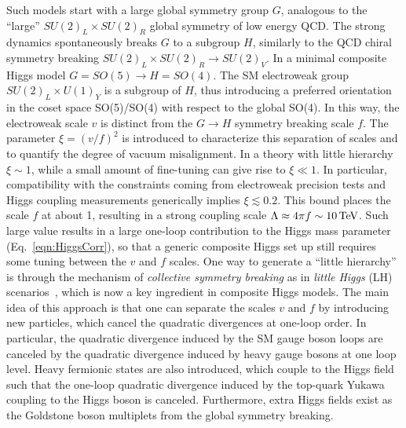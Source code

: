 Such models start with a large global symmetry group $G$, analogous to the ``large'' $SU(2)_L \times SU(2)_R$ global symmetry of low energy QCD.
The strong dynamics spontaneously breaks $G$ to a subgroup $H$, similarly to the QCD chiral symmetry breaking $SU(2)_L \times SU(2)_R \to SU(2)_V$.
In a minimal composite Higgs model $G = SO(5) \to H = SO(4)$.
The SM electroweak group $SU(2)_L \times U(1)_Y$ is a subgroup of $H$, thus introducing a preferred orientation in the coset space SO(5)/SO(4) with respect to the global SO(4).
In this way, the electroweak scale $v$ is distinct from the $G \to H$ symmetry breaking scale $f$. The parameter $\xi = (v/f)^2$ is introduced to characterize this separation of scales and to quantify the degree of vacuum misalignment.
In a theory with little hierarchy $\xi \sim 1$, while a small amount of fine-tuning can give rise to $\xi \ll 1$. In particular, compatibility with the constraints coming from electroweak precision tests and Higgs coupling measurements generically implies $\xi \lesssim 0.2$. This bound places the scale $f$ at about 1\TeV, resulting in a strong coupling scale $\Lambda \approx 4\pi f \sim 10\,\text{Te\hspace{-.08em}V}$.
Such large value results in a large one-loop contribution to the Higgs mass parameter (Eq.~\ref{eqn:HiggsCorr}), so that a generic composite Higgs set up still requires some tuning between the $v$ and $f$ scales.
One way to generate a ``little hierarchy'' is through the mechanism of \textit{collective symmetry breaking} as in \textit{little Higgs} (LH) scenarios~\cite{Han:2003wu,Perelstein:2005ka,Schmaltz:2005ky,Arkani:2002LH,Burdman:2002ns}, which is now a key ingredient in composite Higgs models.
The main idea of this approach is that one can separate the scales $v$ and $f$ by introducing new particles, which cancel the quadratic divergences at one-loop order. 
In particular, the quadratic divergence induced by the SM gauge boson loops are canceled by the quadratic divergence induced by heavy gauge bosons at one loop level.
Heavy fermionic states are also introduced, which couple to the Higgs field such that the one-loop quadratic divergence induced by the top-quark Yukawa coupling to the Higgs boson is canceled.
Furthermore, extra Higgs fields exist as the Goldstone boson multiplets from the global symmetry breaking.
